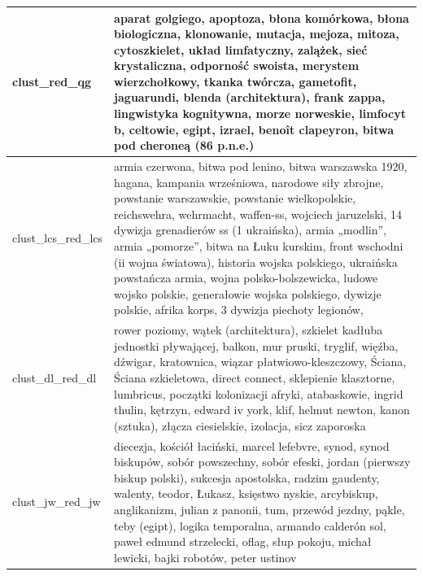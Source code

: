 \documentclass{praca1}
\begin{document}
\begin{longtable}{|L{0.5cm}|L{15cm}|}
   \hline
\begin{sideways}clust\_red\_qg\end{sideways} & aparat golgiego, apoptoza, błona komórkowa, błona biologiczna, klonowanie, mutacja, mejoza, mitoza, cytoszkielet, układ limfatyczny, zalążek, sieć krystaliczna, odporność swoista, merystem wierzchołkowy, tkanka twórcza, gametofit, jaguarundi, blenda (architektura), frank zappa, lingwistyka kognitywna, morze norweskie, limfocyt b, celtowie, egipt, izrael, benoît clapeyron, bitwa pod cheroneą (86 p.n.e.) \\ %
   \hline
\begin{sideways}clust\_lcs\_red\_lcs\end{sideways} & armia czerwona, bitwa pod lenino, bitwa warszawska 1920, hagana, kampania wrześniowa, narodowe siły zbrojne, powstanie warszawskie, powstanie wielkopolskie, reichswehra, wehrmacht, waffen-ss, wojciech jaruzelski, 14 dywizja grenadierów ss (1 ukraińska), armia „modlin”, armia „pomorze”, bitwa na Łuku kurskim, front wschodni (ii wojna światowa), historia wojska polskiego, ukraińska powstańcza armia, wojna polsko-bolszewicka, ludowe wojsko polskie, generałowie wojska polskiego, dywizje polskie, afrika korps, 3 dywizja piechoty legionów, \\ %
   \hline
\begin{sideways}clust\_dl\_red\_dl\end{sideways} & rower poziomy, wątek (architektura), szkielet kadłuba jednostki pływającej, balkon, mur pruski, tryglif, więźba, dźwigar, kratownica, wiązar płatwiowo-kleszczowy, Ściana, Ściana szkieletowa, direct connect, sklepienie klasztorne, lumbricus, początki kolonizacji afryki, atabaskowie, ingrid thulin, kętrzyn, edward iv york, klif, helmut newton, kanon (sztuka), złącza ciesielskie, izolacja, sicz zaporoska \\ %
   \hline
\begin{sideways}clust\_jw\_red\_jw\end{sideways} & diecezja, kościół łaciński, marcel lefebvre, synod, synod biskupów, sobór powszechny, sobór efeski, jordan (pierwszy biskup polski), sukcesja apostolska, radzim gaudenty, walenty, teodor, Łukasz, księstwo nyskie, arcybiskup, anglikanizm, julian z panonii, tum, przewód jezdny, pąkle, teby (egipt), logika temporalna, armando calderón sol, paweł edmund strzelecki, oflag, słup pokoju, michał lewicki, bajki robotów, peter ustinov \\ %

\end{longtable}
\end{document}
